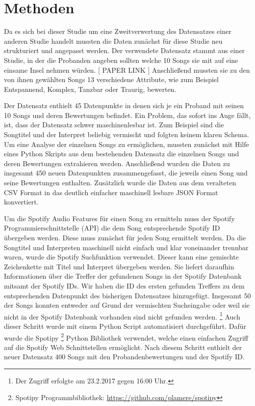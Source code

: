 \section*{Methoden}
\label{sec:Methoden}

Da es sich bei dieser Studie um eine Zweitverwertung des Datensatzes einer anderen Studie handelt mussten die Daten zunächst für diese Studie neu strukturiert und angepasst werden.
Der verwendete Datensatz stammt aus einer Studie, in der die Probanden angeben sollten welche 10 Songs sie mit auf eine einsame Insel nehmen würden. [ PAPER LINK ]
Anschließend mussten sie zu den von ihnen gewählten Songs 13 verschiedene Attribute, wie zum Beispiel Entspannend, Komplex, Tanzbar oder Traurig, bewerten.

Der Datensatz enthielt 45 Datenpunkte in denen sich je ein Proband mit seinen 10 Songs und deren Bewertungen befindet.
Ein Problem, das sofort ins Auge fällt, ist, dass der Datensatz schwer maschinenlesbar ist. 
Zum Beispiel sind die Songtitel und der Interpret beliebig vermischt und folgten keinem klaren Schema.
Um eine Analyse der einzelnen Songs zu ermöglichen, mussten zunächst mit Hilfe eines Python Skripts aus dem bestehenden Datensatz die einzelnen Songs und deren Bewertungen extrahieren werden.
Anschließend wurden die Daten zu insgesamt 450 neuen Datenpunkten zusammengefasst, die jeweils einen Song und seine Bewertungen enthalten.
Zusätzlich wurde die Daten aus dem veralteten CSV Format in das deutlich einfacher maschinell lesbare JSON Format konvertiert.

Um die Spotify Audio Features für einen Song zu ermitteln muss der Spotify Programmierschnittstelle (API) die dem Song entsprechende Spotify ID übergeben werden.
Diese muss zunächst für jeden Song ermittelt werden.
Da die Songtitel und Interpreten maschinell nicht einfach und klar voneinander trennbar waren, wurde die Spotify Suchfunktion verwendet.
Dieser kann eine gemischte Zeichenkette mit Titel und Interpret übergeben werden.
Sie liefert daraufhin Informationen über die Treffer der gefundenen Songs in der Spotify Datenbank mitsamt der Spotify IDs.
Wir haben die ID des ersten gefunden Treffers zu dem entsprechenden Datenpunkt des bisherigen Datensatzes hinzugefügt.
Insgesamt 50 der Songs konnten entweder auf Grund der vermischten Sucheingabe oder weil sie nicht in der Spotify Datenbank vorhanden sind nicht gefunden werden.
\footnote{Der Zugriff erfolgte am 23.2.2017 gegen 16:00 Uhr.}
Auch dieser Schritt wurde mit einem Python Script automatisiert durchgeführt.
Dafür wurde die Spotipy \footnote{Spotipy Programmbibliothek: \url{https://github.com/plamere/spotipy}} Python Bibliothek verwendet, welche einen einfachen Zugriff auf die Spotify Web Schnittstellen ermöglicht.
Nach diesem Schritt enthielt der neuer Datensatz 400 Songs mit den Probandenbewertungen und der Spotify ID.

